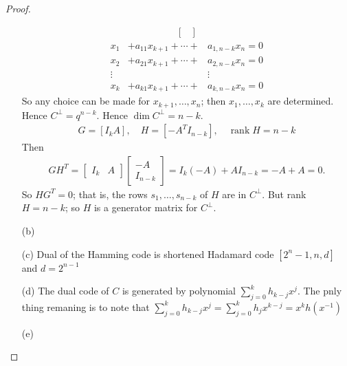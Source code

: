 \begin{proof}
\begin{itemize}
\begin{gather*}
\begin{bmatrix}
            \end{bmatrix}
            \end{gather*}
            \begin{align*}
                x_1& + a_{11} x_{k+1} + \cdots + &a_{1, n-k} x_n = 0\\
                x_2& + a_{21} x_{k+1} + \cdots + &a_{2, n-k} x_n = 0\\
                \vdots& \quad& \vdots\\
                x_k& + a_{k 1} x_{k+1} + \cdots + &a_{k, n-k} x_n=0
            \end{align*}
            So any choice can be made for $x_{k+1}, \ldots, x_n$; then $x_1, \ldots, x_k$ are determined. Hence $C^{\perp}=q^{n-k}$. Hence $\operatorname{dim} C^{\perp}=n-k$.
            \begin{gather*}
                G=\left[I_k A\right], \quad H=\left[-A^T I_{n-k}\right], \quad \operatorname{rank} H=n-k
            \end{gather*}
            Then
            \begin{gather*}
                G H^T=\left[\begin{array}{ll}
                I_k & A
                \end{array}\right]\left[\begin{array}{c}
                -A \\
                I_{n-k}
                \end{array}\right]=I_k(-A)+A I_{n-k}=-A+A=0 .
            \end{gather*}
            So $H G^T=0$; that is, the rows $s_1, \ldots, s_{n-k}$ of $H$ are in $C^{\perp}$. But rank $H=n-k$; so $H$ is a generator matrix for $C^{\perp}$.
        \item[(b)] 
        \item[(c)] Dual of the Hamming code is shortened Hadamard code $\left[2^{n}-1, n, d\right]$ and $d = 2^{n-1}$
        \item[(d)] The dual code of $C$ is generated by polynomial $\sum\limits_{j = 0}^{k} h_{k-j} x^{j}$. The pnly thing remaning is to note that $\sum\limits_{j = 0}^{k} h_{k-j} x^{j} = \sum\limits_{j = 0}^{k} h_j x^{k-j} = x^{k} h (x^{-1})$
        \item[(e)] 
    \end{itemize}
\end{proof}
\vskip 0.4in





